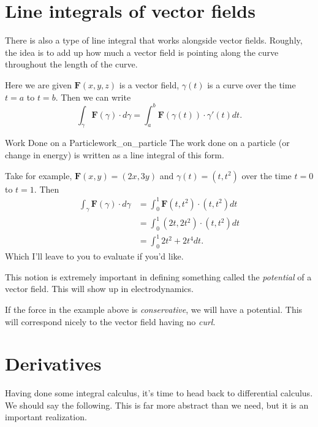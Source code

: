         \section{Line integrals of vector fields}
        
        There is also a type of line integral that works alongside vector fields.  Roughly, the idea is to add up how much a vector field is pointing along the curve throughout the length of the curve.  
        
        Here we are given $\mathbf{F}(x,y,z)$ is a vector field, $\gamma(t)$ is a curve over the time $t=a$ to $t=b$.  Then we can write
        \[
        \int_\gamma \mathbf{F}(\gamma)\cdot d\gamma =\int_a^b \mathbf{F}(\gamma(t))\cdot \gamma'(t) dt.
        \]
        
        \begin{ex}{Work Done on a Particle}{work_on_particle}
        The work done on a particle (or change in energy) is written as a line integral of this form.  
        
        Take for example, $\mathbf{F}(x,y)=(2x,3y)$ and $\gamma(t)=(t,t^2)$ over the time $t=0$ to $t=1$.  Then
        \begin{align*}
        \int_\gamma \mathbf{F}(\gamma)\cdot d\gamma &= \int_0^1 \mathbf{F}(t,t^2)\cdot (t,t^2)dt\\
        &= \int_0^1 (2t,2t^2)\cdot(t,t^2)dt\\
        &=\int_0^1 2t^2+2t^4dt.
        \end{align*}
        Which I'll leave to you to evaluate if you'd like.
        \end{ex}
        
        \begin{remark}
        This notion is extremely important in defining something called the \emph{potential} of a vector field.  This will show up in electrodynamics.
        
        If the force in the example above is \emph{conservative}, we will have a potential.  This will correspond nicely to the vector field having no \emph{curl}.
        \end{remark}
        
        \section{Derivatives}
        Having done some integral calculus, it's time to head back to differential calculus.  We should say the following. This is far more abstract than we need, but it is an important realization.  
        
